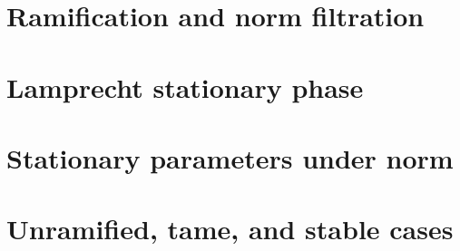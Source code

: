 \chapter{Ramification and norm filtration}
















\chapter{Lamprecht stationary phase}







\chapter{Stationary parameters under norm}















\chapter{Unramified, tame, and stable cases}









